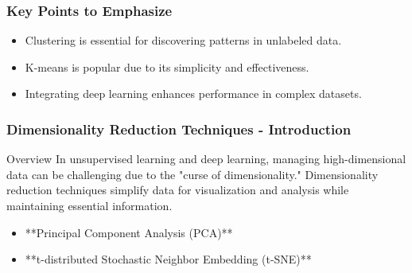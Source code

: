 \documentclass[aspectratio=169]{beamer}
\begin{document}
\begin{frame}[fragile]
    \frametitle{Key Points to Emphasize}
    \begin{itemize}
        \item Clustering is essential for discovering patterns in unlabeled data.
        \item K-means is popular due to its simplicity and effectiveness.
        \item Integrating deep learning enhances performance in complex datasets.
    \end{itemize}
\end{frame}

\begin{frame}[fragile]
    \frametitle{Dimensionality Reduction Techniques - Introduction}
    
    \begin{block}{Overview}
        In unsupervised learning and deep learning, managing high-dimensional data can be challenging due to the "curse of dimensionality." 
        Dimensionality reduction techniques simplify data for visualization and analysis while maintaining essential information.
    \end{block}

    \begin{itemize}
        \item **Principal Component Analysis (PCA)**
        \item **t-distributed Stochastic Neighbor Embedding (t-SNE)**
    \end{itemize}
\end{frame}
\end{document}
